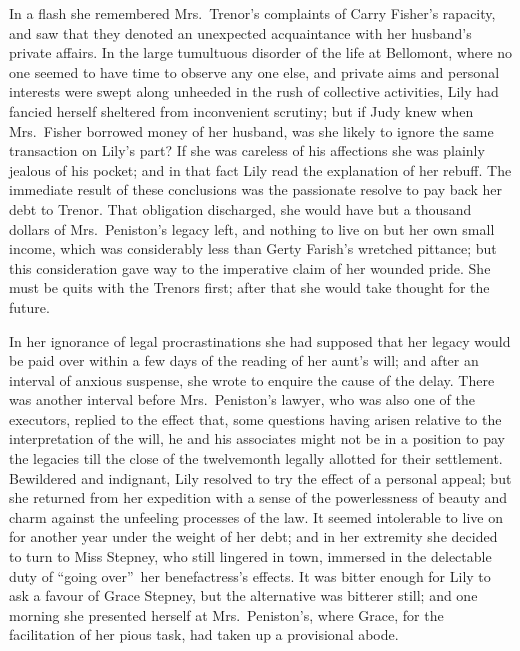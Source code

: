 \documentclass[12pt,a4paper]{book}
\begin{document}
In a flash she remembered Mrs.\ Trenor's complaints of Carry
Fisher's rapacity, and saw that they denoted an unexpected
acquaintance with her husband's private affairs. In the large
tumultuous disorder of the life at Bellomont, where no one seemed
to have time to observe any one else, and private aims and
personal interests were swept along unheeded in the rush of
collective activities, Lily had fancied herself sheltered from
inconvenient scrutiny; but if Judy knew when Mrs.\ Fisher borrowed
money of her husband, was she likely to ignore the same
transaction on Lily's part? If she was careless of his affections
she was plainly jealous of his pocket; and in that fact Lily read
the explanation of her rebuff. The immediate result of these
conclusions was the passionate resolve to pay back her debt to
Trenor. That obligation discharged, she would have but a thousand
dollars of Mrs.\ Peniston's legacy left, and nothing to live on
but her own small income, which was considerably less than Gerty
Farish's wretched pittance; but this consideration gave way to
the imperative claim of her wounded pride. She must be
quits with the Trenors first; after that she would take thought
for the future.





In her ignorance of legal procrastinations she had supposed that
her legacy would be paid over within a few days of the reading of
her aunt's will; and after an interval of anxious suspense, she
wrote to enquire the cause of the delay. There was another
interval before Mrs.\ Peniston's lawyer, who was also one of the
executors, replied to the effect that, some questions having
arisen relative to the interpretation of the will, he and his
associates might not be in a position to pay the legacies till
the close of the twelvemonth legally allotted for their
settlement. Bewildered and indignant, Lily resolved to try the
effect of a personal appeal; but she returned from her expedition
with a sense of the powerlessness of beauty and charm against the
unfeeling processes of the law. It seemed intolerable to live on
for another year under the weight of her debt; and in her
extremity she decided to turn to Miss Stepney, who still lingered
in town, immersed in the delectable duty of ``going over''\ her
benefactress's effects. It was bitter enough for Lily to ask a
favour of Grace Stepney, but the alternative was bitterer still;
and one morning she presented herself at Mrs.\ Peniston's, where
Grace, for the facilitation of her pious task, had taken up a
provisional abode.
\end{document}
